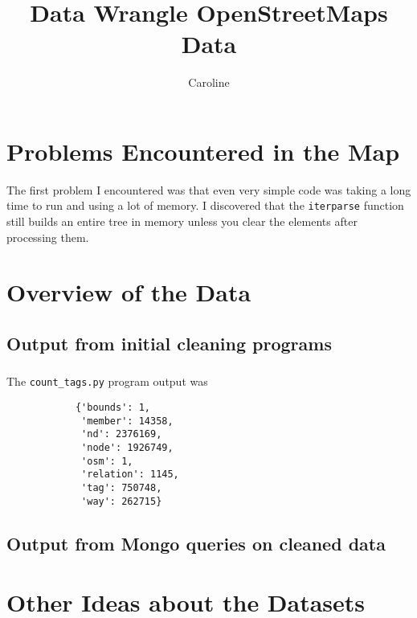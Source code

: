 \documentclass{article}
\author{Caroline}
\title{Data Wrangle OpenStreetMaps Data}
\begin{document}
    \maketitle
    \section{Problems Encountered in the Map}
        The first problem I encountered was that even very simple code was
        taking a long time to run and using a lot of memory. I discovered that
        the \texttt{iterparse} function still builds an entire tree in memory unless
        you clear the elements after processing them.
    \section{Overview of the Data}
        \subsection{Output from initial cleaning programs}
            \subsubsection{}
            The \texttt{count\_tags.py} program output was
            \begin{lstlisting}
            {'bounds': 1,
             'member': 14358,
             'nd': 2376169,
             'node': 1926749,
             'osm': 1,
             'relation': 1145,
             'tag': 750748,
             'way': 262715}
            \end{lstlisting}
        \subsection{Output from Mongo queries on cleaned data}
    \section{Other Ideas about the Datasets}
\end{document}
